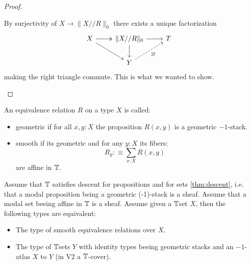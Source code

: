 \documentclass{article}
\begin{document}
\begin{proof}
\begin{itemize}
    By surjectivity of $X \to \|X // R \|_0$ there exists a unique factorization 
\[\begin{tikzcd}
	X & {\|X // R\|_0} & T \\
	& Y
	\arrow[two heads, from=1-1, to=1-2]
	\arrow[from=1-1, to=2-2]
	\arrow[from=1-2, to=1-3]
	\arrow[from=1-2, to=2-2]
	\arrow["{\exists!}"', dashed, from=2-2, to=1-3]
\end{tikzcd}\]
making the right triangle commute. This is what we wanted to show.
\end{itemize}
\end{proof}

\begin{definition}
An equivalence relation $R$ on a type $X$ is called:
\begin{itemize}
\item geometric if for all $x,y:X$ the proposition $R(x,y)$ is a geometric $-1$-stack.
\item smooth if its geometric and for any $y:X$ its fibers:
\[R_y :\equiv \sum_{x:X} R(x,y)\]
are affine in $\mathbb{T}$.
\end{itemize}
\end{definition}

\begin{lemma}\label{fundamental-propriety-algebraic-spaces}
Assume that $\mathbb{T}$ satisfies descent for propositions and for sets \ref{thm:descent}, i.e. that a modal proposition being a geometric (-1)-stack is a sheaf. Assume that a modal set beeing affine in $\mathbb{T}$ is a sheaf.
Assume given a $\mathbb{T}$set $X$, then the following types are equivalent:
\begin{itemize}
\item The type of smooth equivalence relations over $X$.
\item The type of $\mathbb{T}$sets $Y$ with identity types beeing geometric stacks and an $-1$-atlas $X$ to $Y$ (in V2 a $\mathbb{T}$-cover).
\end{itemize}
\end{lemma}
\end{document}
